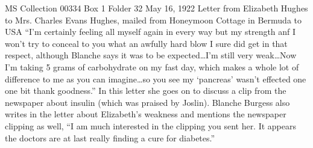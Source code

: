 \documentclass[12pt]{article}
\begin{document}
MS Collection 00334
Box 1 Folder 32
May 16, 1922
Letter from Elizabeth Hughes to Mrs. Charles Evans Hughes, mailed from Honeymoon Cottage in Bermuda to USA
``I'm certainly feeling all myself again in every way but my strength anf I won't try to conceal to you what an awfully hard blow I sure did get in that respect, although Blanche says it was to be expected\dots I'm still very weak\dots Now I'm taking 5 grams of carbohydrate on my fast day, which makes a whole lot of difference to me as you can imagine\dots so you see my `pancreas' wasn't effected one one bit thank goodness.''
In this letter she goes on to discuss a clip from the newspaper about insulin (which was praised by Joslin). Blanche Burgess also writes in the letter about Elizabeth's weakness and mentions the newspaper clipping as well, ``I am much interested in the clipping you sent her. It appears the doctors are at last really finding a cure for diabetes.'' 
\end{document}

